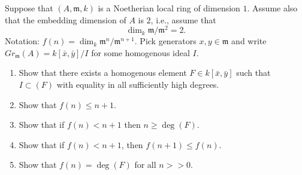 \begin{exercise}
Suppose that $(A,{\mathfrak m},k)$ is a Noetherian local ring of
dimension $1$. Assume also that the embedding dimension of $A$ is
$2$, i.e., assume that
$$
\dim_k {\mathfrak m}/{\mathfrak m}^2 = 2.	
$$
Notation: $f(n) = \dim_k {\mathfrak m}^n/{\mathfrak m}^{n+1}$.
Pick generators $x,y \in {\mathfrak m}$ 
and write $Gr_{\mathfrak m}(A) = k[\bar x,\bar y]/I$ for some
homogenous ideal $I$.
\begin{enumerate}
\item Show that there exists a homogenous element
$F\in k[\bar x, \bar y]$ such that $I \subset (F)$ with equality
in all sufficiently high degrees.
\item Show that $f(n) \leq n+1$.
\item Show that if $f(n) < n+1$ then $n \geq \deg(F)$.
\item Show that if $f(n) < n+1$, then $f(n+1) \leq f(n)$.
\item Show that $f(n) = \deg(F)$ for all $n >> 0$.
\end{enumerate}
\end{exercise}

